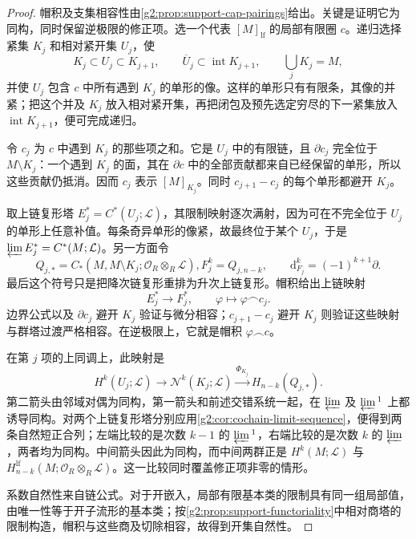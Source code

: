 \begin{proof}
	帽积及支集相容性由\cref{g2:prop:support-cap-pairings}给出。关键是证明它为同构，同时保留逆极限的修正项。选一个代表 \([M]_{\mathrm{lf}}\) 的局部有限圈 \(c\)。递归选择紧集 \(K_j\) 和相对紧开集 \(U_j\)，使
	\[
		K_j\subset U_j\subset K_{j+1},\qquad
		\overline U_j\subset\operatorname{int}K_{j+1},\qquad \bigcup_jK_j=M,
	\]
	并使 \(U_j\) 包含 \(c\) 中所有遇到 \(K_j\) 的单形的像。这样的单形只有有限条，其像的并紧；把这个并及 \(K_j\) 放入相对紧开集，再把闭包及预先选定穷尽的下一紧集放入 \(\operatorname{int}K_{j+1}\)，便可完成递归。

	令 \(c_j\) 为 \(c\) 中遇到 \(K_j\) 的那些项之和。它是 \(U_j\) 中的有限链，且 \(\partial c_j\) 完全位于 \(M\setminus K_j\)：一个遇到 \(K_j\) 的面，其在 \(\partial c\) 中的全部贡献都来自已经保留的单形，所以这些贡献仍抵消。因而 \(c_j\) 表示 \([M]_{K_j}\)。同时 \(c_{j+1}-c_j\) 的每个单形都避开 \(K_j\)。

	取上链复形塔 \(E_j^*=C^*(U_j;\mathcal L)\)，其限制映射逐次满射，因为可在不完全位于 \(U_j\) 的单形上任意补值。每条奇异单形的像紧，故最终位于某个 \(U_j\)，于是 \(\varprojlim E_j^*=C^*(M;\mathcal L)\)。另一方面令
	\[
		Q_{j,*}=C_*(M,M\setminus K_j;\mathcal O_R\otimes_R\mathcal L),
		F_j^k=Q_{j,n-k},\qquad \mathrm d_{F_j}^k=(-1)^{k+1}\partial.
	\]
	最后这个符号只是把降次链复形重排为升次上链复形。帽积给出上链映射
	\[
		E_j^*\longrightarrow F_j^*,\qquad \varphi\longmapsto\varphi\frown c_j.
	\]
	边界公式以及 \(\partial c_j\) 避开 \(K_j\) 验证与微分相容；\(c_{j+1}-c_j\) 避开 \(K_j\) 则验证这些映射与群塔过渡严格相容。在逆极限上，它就是帽积 \(\varphi\frown c\)。

	在第 \(j\) 项的上同调上，此映射是
	\[
		H^k(U_j;\mathcal L)\longrightarrow\mathcal N^k(K_j;\mathcal L)
		\xrightarrow{\Phi_{K_j}}H_{n-k}(Q_{j,*}).
	\]
	第二箭头由邻域对偶为同构，第一箭头和前述交错系统一起，在 \(\varprojlim\) 及 \(\varprojlim{}^1\) 上都诱导同构。对两个上链复形塔分别应用\cref{g2:cor:cochain-limit-sequence}，便得到两条自然短正合列；左端比较的是次数 \(k-1\) 的 \(\varprojlim{}^1\)，右端比较的是次数 \(k\) 的 \(\varprojlim\)，两者均为同构。中间箭头因此为同构，而中间两群正是 \(H^k(M;\mathcal L)\) 与 \(H_{n-k}^{\mathrm{lf}}(M;\mathcal O_R\otimes_R\mathcal L)\)。这一比较同时覆盖修正项非零的情形。

	系数自然性来自链公式。对于开嵌入，局部有限基本类的限制具有同一组局部值，由唯一性等于开子流形的基本类；按\cref{g2:prop:support-functoriality}中相对商塔的限制构造，帽积与这些商及切除相容，故得到开集自然性。
\end{proof}


